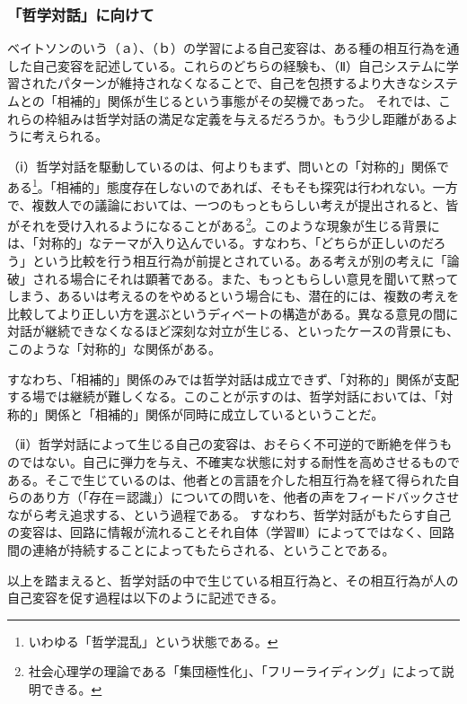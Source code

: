 \documentclass[9pt,b5j,twoside,twocolumn]{utarticle}
\begin{document}
\subsubsection*{「哲学対話」に向けて}
ベイトソンのいう（ａ）、（ｂ）の学習による自己変容は、ある種の相互行為を通した自己変容を記述している。これらのどちらの経験も、（Ⅱ）自己システムに学習されたパターンが維持されなくなることで、自己を包摂するより大きなシステムとの「相補的」関係が生じるという事態がその契機であった。
それでは、これらの枠組みは哲学対話の満足な定義を与えるだろうか。もう少し距離があるように考えられる。


（ⅰ）哲学対話を駆動しているのは、何よりもまず、問いとの「対称的」関係である\footnote{いわゆる「哲学混乱」という状態である。}。「相補的」態度存在しないのであれば、そもそも探究は行われない。一方で、複数人での議論においては、一つのもっともらしい考えが提出されると、皆がそれを受け入れるようになることがある\footnote{社会心理学の理論である「集団極性化」、「フリーライディング」によって説明できる。}。このような現象が生じる背景には、「対称的」なテーマが入り込んでいる。すなわち、「どちらが正しいのだろう」という比較を行う相互行為が前提とされている。ある考えが別の考えに「論破」される場合にそれは顕著である。また、もっともらしい意見を聞いて黙ってしまう、あるいは考えるのをやめるという場合にも、潜在的には、複数の考えを比較してより正しい方を選ぶというディベートの構造がある。異なる意見の間に対話が継続できなくなるほど深刻な対立が生じる、といったケースの背景にも、このような「対称的」な関係がある。



すなわち、「相補的」関係のみでは哲学対話は成立できず、「対称的」関係が支配する場では継続が難しくなる。このことが示すのは、哲学対話においては、「対称的」関係と「相補的」関係が同時に成立しているということだ。


（ⅱ）哲学対話によって生じる自己の変容は、おそらく不可逆的で断絶を伴うものではない。自己に弾力を与え、不確実な状態に対する耐性を高めさせるものである。そこで生じているのは、他者との言語を介した相互行為を経て得られた自らのあり方（「存在＝認識」）についての問いを、他者の声をフィードバックさせながら考え追求する、という過程である。%
すなわち、哲学対話がもたらす自己の変容は、回路に情報が流れることそれ自体（学習Ⅲ）によってではなく、回路間の連絡が持続することによってもたらされる、ということである。


以上を踏まえると、哲学対話の中で生じている相互行為と、その相互行為が人の自己変容を促す過程は以下のように記述できる。
\end{document}
